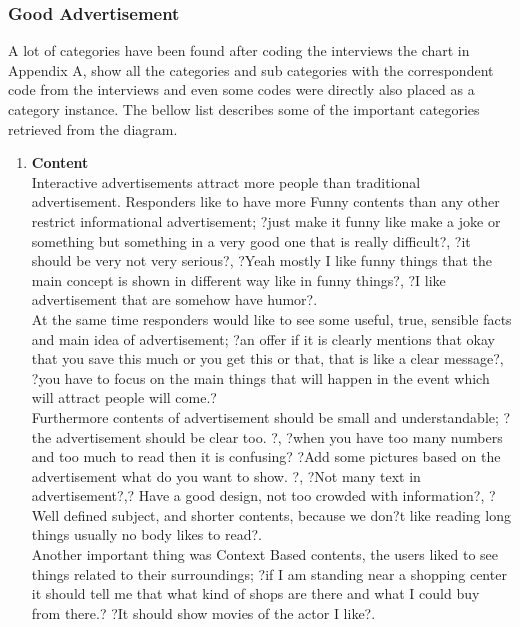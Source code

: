 \subsubsection{Good Advertisement}
A lot of categories have been found after coding the interviews the chart in Appendix A, show all the categories and sub categories with the correspondent code from the interviews and even some codes were directly also placed as a category instance. The bellow list describes some of the important categories retrieved from the diagram.


\begin{enumerate}
\item \textbf{Content} \\
Interactive advertisements attract more people than traditional advertisement.
Responders like to have more Funny contents than any other restrict informational advertisement; ?just make it funny like make a joke or something but something in a very good one that is really difficult?, ?it should be very not very serious?, ?Yeah mostly I like funny things that the main concept is shown in different way like in funny things?, ?I like advertisement that are somehow have humor?. 	 \\

At the same time responders would like to see some useful, true, sensible facts and main idea of advertisement; ?an offer if it is clearly mentions that okay that you save this much or you get this or that, that is like a clear message?,  ?you have to focus on the main things that will happen in the event which will attract people will come.? \\

Furthermore contents of advertisement should be small and understandable; ?the advertisement should be clear too. ?, ?when you have too many numbers and too much to read then it is confusing?  ?Add some pictures based on the advertisement what do you want to show. ?, ?Not many text in advertisement?,? Have a good design, not too crowded with information?, ?Well defined subject, and shorter contents, because we don?t like reading long things usually no  body likes to read?.  \\

Another important thing was Context Based contents, the users liked to see things related to their surroundings; ?if I am standing near a shopping center it should tell me that what kind of shops are there and what I could buy from there.?  ?It should show movies of the actor I like?. \\
		

\end{enumerate}
